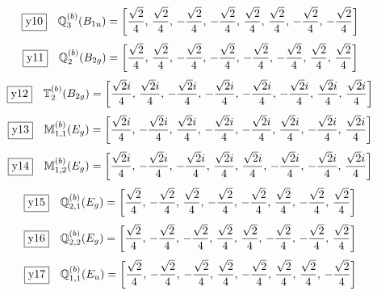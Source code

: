 \documentclass[fleqn,10pt,landscape]{jsarticle}
\begin{document}
\begin{dmath*}
\fbox{y10}\quad \mathbb{Q}_{3}^{(b)}(B_{1u})=\left[ \frac{\sqrt{2}}{4},\, \frac{\sqrt{2}}{4},\, - \frac{\sqrt{2}}{4},\, - \frac{\sqrt{2}}{4},\, \frac{\sqrt{2}}{4},\, \frac{\sqrt{2}}{4},\, - \frac{\sqrt{2}}{4},\, - \frac{\sqrt{2}}{4} \right]
\end{dmath*}
\begin{dmath*}
\fbox{y11}\quad \mathbb{Q}_{2}^{(b)}(B_{2g})=\left[ \frac{\sqrt{2}}{4},\, \frac{\sqrt{2}}{4},\, - \frac{\sqrt{2}}{4},\, - \frac{\sqrt{2}}{4},\, - \frac{\sqrt{2}}{4},\, - \frac{\sqrt{2}}{4},\, \frac{\sqrt{2}}{4},\, \frac{\sqrt{2}}{4} \right]
\end{dmath*}
\begin{dmath*}
\fbox{y12}\quad \mathbb{T}_{2}^{(b)}(B_{2g})=\left[ \frac{\sqrt{2} i}{4},\, \frac{\sqrt{2} i}{4},\, - \frac{\sqrt{2} i}{4},\, - \frac{\sqrt{2} i}{4},\, - \frac{\sqrt{2} i}{4},\, - \frac{\sqrt{2} i}{4},\, \frac{\sqrt{2} i}{4},\, \frac{\sqrt{2} i}{4} \right]
\end{dmath*}
\begin{dmath*}
\fbox{y13}\quad \mathbb{M}_{1,1}^{(b)}(E_{g})=\left[ \frac{\sqrt{2} i}{4},\, - \frac{\sqrt{2} i}{4},\, \frac{\sqrt{2} i}{4},\, - \frac{\sqrt{2} i}{4},\, - \frac{\sqrt{2} i}{4},\, \frac{\sqrt{2} i}{4},\, - \frac{\sqrt{2} i}{4},\, \frac{\sqrt{2} i}{4} \right]
\end{dmath*}
\begin{dmath*}
\fbox{y14}\quad \mathbb{M}_{1,2}^{(b)}(E_{g})=\left[ \frac{\sqrt{2} i}{4},\, - \frac{\sqrt{2} i}{4},\, - \frac{\sqrt{2} i}{4},\, \frac{\sqrt{2} i}{4},\, \frac{\sqrt{2} i}{4},\, - \frac{\sqrt{2} i}{4},\, - \frac{\sqrt{2} i}{4},\, \frac{\sqrt{2} i}{4} \right]
\end{dmath*}
\begin{dmath*}
\fbox{y15}\quad \mathbb{Q}_{2,1}^{(b)}(E_{g})=\left[ \frac{\sqrt{2}}{4},\, - \frac{\sqrt{2}}{4},\, \frac{\sqrt{2}}{4},\, - \frac{\sqrt{2}}{4},\, - \frac{\sqrt{2}}{4},\, \frac{\sqrt{2}}{4},\, - \frac{\sqrt{2}}{4},\, \frac{\sqrt{2}}{4} \right]
\end{dmath*}
\begin{dmath*}
\fbox{y16}\quad \mathbb{Q}_{2,2}^{(b)}(E_{g})=\left[ \frac{\sqrt{2}}{4},\, - \frac{\sqrt{2}}{4},\, - \frac{\sqrt{2}}{4},\, \frac{\sqrt{2}}{4},\, \frac{\sqrt{2}}{4},\, - \frac{\sqrt{2}}{4},\, - \frac{\sqrt{2}}{4},\, \frac{\sqrt{2}}{4} \right]
\end{dmath*}
\begin{dmath*}
\fbox{y17}\quad \mathbb{Q}_{1,1}^{(b)}(E_{u})=\left[ \frac{\sqrt{2}}{4},\, - \frac{\sqrt{2}}{4},\, - \frac{\sqrt{2}}{4},\, \frac{\sqrt{2}}{4},\, - \frac{\sqrt{2}}{4},\, \frac{\sqrt{2}}{4},\, \frac{\sqrt{2}}{4},\, - \frac{\sqrt{2}}{4} \right]
\end{dmath*}
\end{document}
